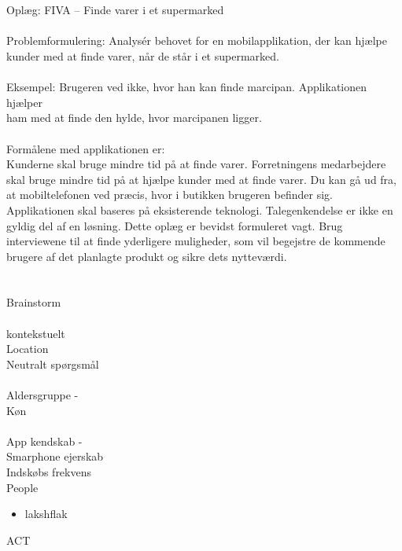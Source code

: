 \documentclass[12pt]{article}
\begin{document}
\section*{}
Oplæg: FIVA – Finde varer i et supermarked\\
\\
Problemformulering: Analysér behovet for en mobilapplikation, der kan hjælpe kunder med at finde varer, når de står i et
supermarked.\\
\\
Eksempel: Brugeren ved ikke, hvor han kan finde marcipan. Applikationen hjælper\\
ham med at finde den hylde, hvor marcipanen ligger.\\
\\
Formålene med applikationen er:\\
Kunderne skal bruge mindre tid på at finde varer.
Forretningens medarbejdere skal bruge mindre tid på at hjælpe kunder med at finde varer. Du kan gå ud fra, at mobiltelefonen ved præcis, hvor i butikken brugeren befinder sig. Applikationen skal baseres på eksisterende teknologi. Talegenkendelse er ikke en gyldig del af en løsning. Dette oplæg er bevidst formuleret vagt. Brug interviewene til at finde yderligere muligheder, som vil begejstre de kommende brugere af det planlagte produkt og sikre dets nytteværdi.

\section*{}
Brainstorm\\
\\
kontekstuelt\\
Location\\
Neutralt sp\o rgsm\aa l\\
\\
Aldersgruppe - \\ 
K\o n\\
\\
App kendskab - \\
Smarphone ejerskab\\
Indsk\o bs frekvens\\


People
\begin{itemize}
\item lakshflak
\end{itemize}


ACT

   
\end{document}
